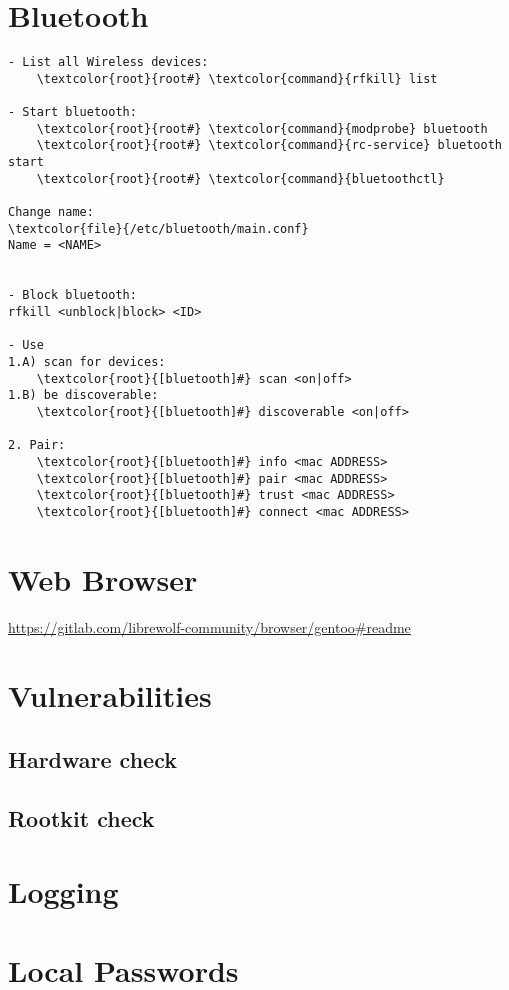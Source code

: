 \documentclass[10pt, a4paper, onecolumn, openany]{book}         %
\begin{document}
\section{Bluetooth}
\begin{Verbatim}[commandchars=\\\{\}]
- List all Wireless devices:
    \textcolor{root}{root#} \textcolor{command}{rfkill} list

- Start bluetooth:
    \textcolor{root}{root#} \textcolor{command}{modprobe} bluetooth
    \textcolor{root}{root#} \textcolor{command}{rc-service} bluetooth start
    \textcolor{root}{root#} \textcolor{command}{bluetoothctl}

Change name:
\textcolor{file}{/etc/bluetooth/main.conf}
Name = <NAME>


- Block bluetooth:
rfkill <unblock|block> <ID>

- Use
1.A) scan for devices:
    \textcolor{root}{[bluetooth]#} scan <on|off>
1.B) be discoverable:
    \textcolor{root}{[bluetooth]#} discoverable <on|off>
    
2. Pair:
    \textcolor{root}{[bluetooth]#} info <mac ADDRESS>
    \textcolor{root}{[bluetooth]#} pair <mac ADDRESS>
    \textcolor{root}{[bluetooth]#} trust <mac ADDRESS>
    \textcolor{root}{[bluetooth]#} connect <mac ADDRESS>
\end{Verbatim}


\section{Web Browser}
\url{https://gitlab.com/librewolf-community/browser/gentoo#readme}

\section{Vulnerabilities}
\subsection{Hardware check}
\subsection{Rootkit check}

\section{Logging}



\section{Local Passwords}
\end{document}
